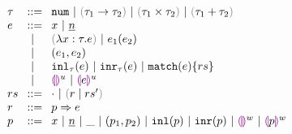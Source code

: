 \begin{figure}[p]
$\arraycolsep=4pt\begin{array}{lll}
\tau & ::= &
  \tnum ~\vert~
  \tarr{\tau_1}{\tau_2} ~\vert~
  \tprod{\tau_1}{\tau_2} ~\vert~
  \tsum{\tau_1}{\tau_2} \\
e & ::= &
  x ~\vert~
  \hnum{n} \\
  & ~\vert~ &
  \hlam{x}{\tau}{e} ~\vert~
  \hap{e_1}{e_2} \\
  & ~\vert~ &
  \hpair{e_1}{e_2} \\
  & ~\vert~ &
  \hinl{\tau}{e} ~\vert~
  \hinr{\tau}{e} ~\vert~
  \hmatch{e}{rs} \\
  & ~\vert~ &
  \hehole{u} ~\vert~
  \hhole{e}{u} \\
rs & ::= &
  \cdot ~\vert~ \hrulesP{r}{rs'} \\
r & ::= &
  \hrul{p}{e} \\
p & ::= &
  x ~\vert~
  \hnum{n} ~\vert~
  \_ ~\vert~
  \hpair{p_1}{p_2} ~\vert~
  \hinlp{p} ~\vert~
  \hinrp{p} ~\vert~
  \hehole{w} ~\vert~
  \hhole{p}{w}
\end{array}$
\end{figure}

